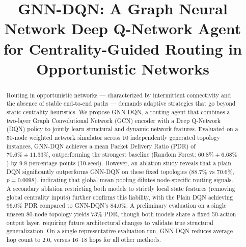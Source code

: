 \documentclass[conference]{IEEEtran}
\begin{document}
\title{GNN-DQN: A Graph Neural Network Deep Q-Network Agent for
Centrality-Guided Routing in Opportunistic Networks}

\author{
\and
{}
\and
{}
\and
{}
}

\maketitle

\begin{abstract}
Routing in opportunistic networks — characterized by intermittent
connectivity and the absence of stable end-to-end paths — demands
adaptive strategies that go beyond static centrality heuristics.
We propose GNN-DQN, a routing agent that combines a two-layer
Graph Convolutional Network (GCN) encoder with a Deep Q-Network
(DQN) policy to jointly learn structural and dynamic network
features. Evaluated on a 50-node weighted network simulator across
10 independently generated topology instances, GNN-DQN achieves a
mean Packet Delivery Ratio (PDR) of $70.6\% \pm 11.33\%$,
outperforming the strongest baseline (Random Forest: $60.8\% \pm
6.68\%$) by 9.8 percentage points (10-seed). However, an ablation
study reveals that a plain DQN significantly outperforms GNN-DQN
on these fixed topologies (88.7\% vs 70.6\%, $p=0.0098$),
indicating that global mean pooling dilutes node-specific routing
signals. A secondary ablation restricting both models to strictly
local state features (removing global centrality inputs) further
confirms this liability, with the Plain DQN achieving 96.0\% PDR
compared to GNN-DQN's 84.0\%. A preliminary evaluation on a single
unseen 80-node topology yields 73\% PDR, though both models share
a fixed 50-action output layer, requiring future architectural
changes to validate true structural generalization. On a single
representative evaluation run, GNN-DQN reduces average hop count
to 2.0, versus 16--18 hops for all other methods.
\end{abstract}
\end{document}
